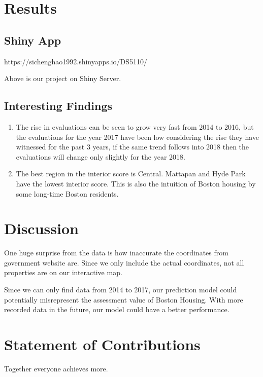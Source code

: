 \documentclass[12pt]{article}
\begin{document}
\section*{Results}

\subsection{Shiny App}

https://sichenghao1992.shinyapps.io/DS5110/

Above is our project on Shiny Server. 

\subsection{Interesting Findings}
    \begin{enumerate}
        \item The rise in evaluations can be seen to grow very fast from 
            2014 to 2016, but the evaluations for the year 2017 have been 
            low considering the rise they have witnessed for the past 3 years, 
            if the same trend follows into 2018 then the evaluations will 
            change only slightly for the year 2018.
        \item The best region in the interior score is Central. Mattapan and 
            Hyde Park have the lowest interior score. This is also the intuition 
            of Boston housing by some long-time Boston residents. 
    \end{enumerate}


\section*{Discussion}

One huge surprise from the data is how inaccurate the coordinates from government website are. Since we only include the actual coordinates, not all properties are on our interactive map. 

Since we can only find data from 2014 to 2017, our prediction model could potentially misrepresent the assessment value of Boston Housing. With more recorded data in the future, our model could have a better performance.

\section*{Statement of Contributions}

Together everyone achieves more.
\end{document}
